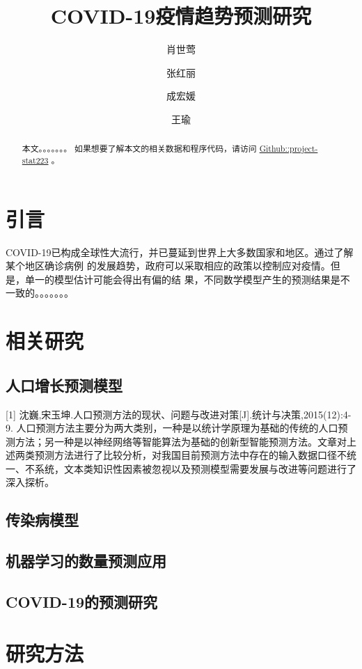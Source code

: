 \documentclass[lang=cn,11pt,a4paper,cite=authoryear]{elegantpaper}
\title{COVID-19疫情趋势预测研究}
\author{肖世莺 \and 张红丽 \and 成宏媛 \and 王瑜}
\date{}
\begin{document}
\maketitle

\begin{abstract}
本文。。。。。。。
如果想要了解本文的相关数据和程序代码，请访问
\href{https://github.com/data-science-in-action/project-stat223}{Github::project-stat223}
。
\end{abstract}

\section{引言}
COVID-19已构成全球性大流行，并已蔓延到世界上大多数国家和地区。通过了解某个地区确诊病例
的发展趋势，政府可以采取相应的政策以控制应对疫情。但是，单一的模型估计可能会得出有偏的结
果，不同数学模型产生的预测结果是不一致的。。。。。。。

\section{相关研究}

\subsection{人口增长预测模型}

[1] 沈巍,宋玉坤.人口预测方法的现状、问题与改进对策[J].统计与决策,2015(12):4-9.
人口预测方法主要分为两大类别，一种是以统计学原理为基础的传统的人口预测方法；另一种是以神经网络等智能算法为基础的创新型智能预测方法。文章对上述两类预测方法进行了比较分析，对我国目前预测方法中存在的输入数据口径不统一、不系统，文本类知识性因素被忽视以及预测模型需要发展与改进等问题进行了深入探析。

\subsection{传染病模型}

\subsection{机器学习的数量预测应用}

\subsection{COVID-19的预测研究}

\section{研究方法}
\end{document}
